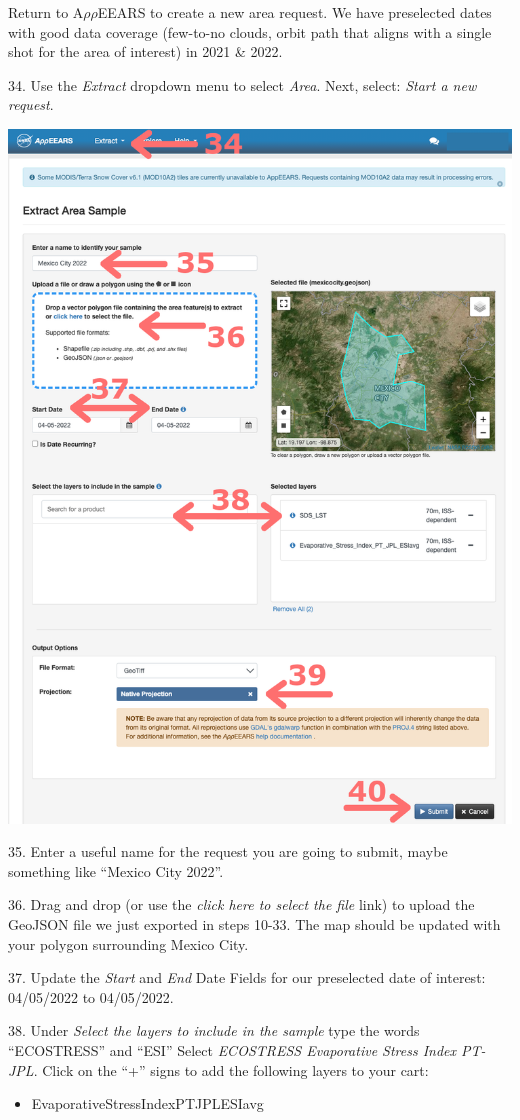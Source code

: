 \documentclass[oneside,a4paper,11pt,explicit]{book}
\begin{document}
Return to A$\rho\rho$EEARS to create a new area request. We have preselected dates with good data coverage (few-to-no clouds, orbit path that aligns with a single shot for the area of interest) in 2021 \& 2022. 

34. Use the \textit{Extract} dropdown menu to select \textit{Area}. Next, select: \textit{Start a new request}. 

\vspace{.5em}

\centerline{\includegraphics[width=.6\textwidth]{ESIareaRequest.png}}

\vspace{.5em}

35. Enter a useful name for the request you are going to submit, maybe something like ``Mexico City 2022''. 

36. Drag and drop (or use the \textit{click here to select the file} link) to upload the GeoJSON file we just exported in steps 10-33. The map should be updated with your polygon surrounding Mexico City.

37. Update the \textit{Start} and \textit{End} Date Fields for our preselected date of interest: 04/05/2022 to 04/05/2022.

38. Under \textit{Select the layers to include in the sample} type the words ``ECOSTRESS'' and ``ESI'' Select \textit{ECOSTRESS Evaporative Stress Index PT-JPL}. Click on the ``+'' signs to add the following layers to your cart: 

\begin{itemize}
	\item Evaporative\textunderscore Stress\textunderscore Index\textunderscore PT\textunderscore JPL\textunderscore ESIavg
\end{itemize}
\end{document}
